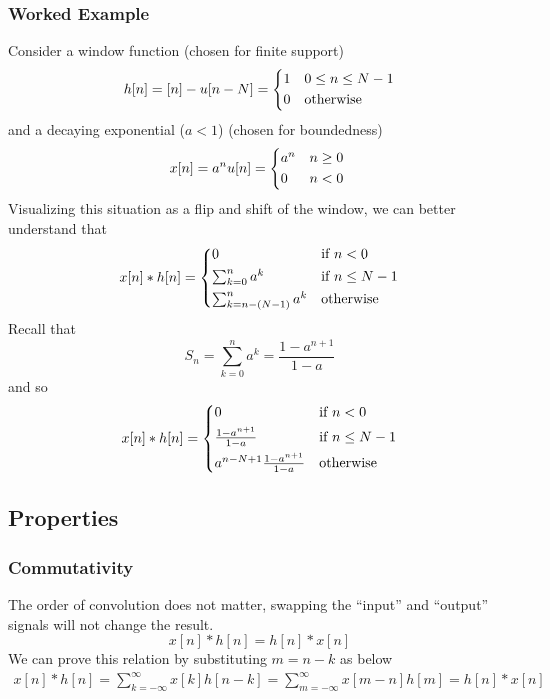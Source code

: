 \documentclass{article}
\begin{document}
\subsubsection{Worked Example}
Consider a window function (chosen for finite support)
\begin{equation*}
    h[n]  = [n]-u[n-N]  = \begin{cases*}
        1 & $0\le n \le N-1$\\
        0 & otherwise
    \end{cases*}
\end{equation*}
and a decaying exponential ($a<1$) (chosen for boundedness)
\begin{equation*}
    x[n]  = a^nu[n] = \begin{cases*}
        a^n & $n\ge 0$\\
        0 & $n<0$
    \end{cases*}
\end{equation*}
Visualizing this situation as a flip and shift of the window, we can better understand that
\[x[n]*h[n]  = \begin{cases*}
    0 & if $n<0$\\
    \sum_{k=0}^n a^k & if $n\le N-1$\\
    \sum_{k=n-(N-1)}^n a^k & otherwise\\
\end{cases*}\]
Recall that $$S_n = \sum_{k=0}^n a^k =\frac{1-a^{n+1}}{1-a} $$ and so
\[x[n]*h[n]  = \begin{cases*}
    0 & if $n<0$\\
    \frac{1-a^{n+1}}{1-a} & if $n\le N-1$\\
    a^{n-N+1}\frac{1-a^{n+1}}{1-a} & otherwise\\
\end{cases*}\]

\subsection{Properties}
\subsubsection{Commutativity}
The order of convolution does not matter, swapping the ``input'' and ``output'' signals will not change the result.
\begin{equation}
    x[n]*h[n] = h[n]*x[n]
\end{equation}
We can prove this relation by substituting $m=n-k$ as below
\begin{align*}
    x[n]*h[n] =
    \sum_{k=-\infty}^\infty x[k]h[n-k] =
    \sum_{m=-\infty}^\infty x[m-n]h[m] =
    h[n]*x[n]
\end{align*}
\end{document}
